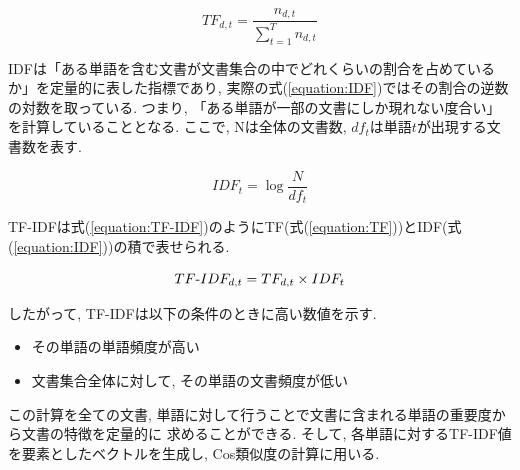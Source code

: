 \documentclass{ltjarticle}
\begin{document}
\begin{equation}
    TF_{d,t} = \dfrac{n_{d,t}}{\sum_{t=1}^T n_{d,t}}
    \label{equation:TF}
\end{equation}
\vspace{5truept}

IDFは「ある単語を含む文書が文書集合の中でどれくらいの割合を占めているか」を定量的に表した指標であり, 
実際の式(\ref{equation:IDF})ではその割合の逆数の対数を取っている. つまり, 「ある単語が一部の文書にしか現れない度合い」を計算していることとなる. 
ここで, Nは全体の文書数, $df_t$は単語$t$が出現する文書数を表す. 
\vspace{5truept}

\begin{equation}
    IDF_t = \log\dfrac{N}{df_t}
    \label{equation:IDF}
\end{equation}
\vspace{5truept}

\newpage
\noindent
TF-IDFは式(\ref{equation:TF-IDF})のようにTF(式(\ref{equation:TF}))とIDF(式(\ref{equation:IDF}))の積で表せられる. 
\vspace{5truept}

\begin{equation}
    TF\mathchar`-IDF_{d,t} = TF_{d,t}\times IDF_t
    \label{equation:TF-IDF}
\end{equation}
\vspace{5truept}

\noindent
したがって, TF-IDFは以下の条件のときに高い数値を示す. 
\vspace{5truept}

\begin{itemize}
    \item その単語の単語頻度が高い
    \item 文書集合全体に対して, その単語の文書頻度が低い
\end{itemize}
\vspace{5truept}

\noindent
この計算を全ての文書, 単語に対して行うことで文書に含まれる単語の重要度から文書の特徴を定量的に
求めることができる. そして, 各単語に対するTF-IDF値を要素としたベクトルを生成し, Cos類似度の計算に用いる. 
\end{document}
